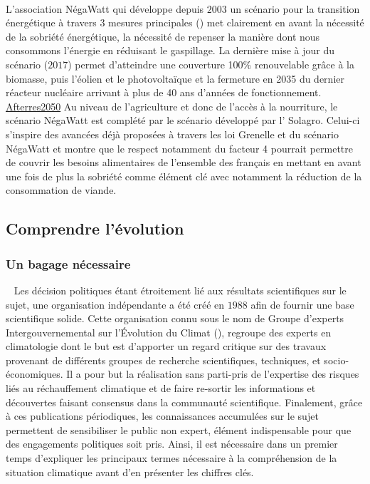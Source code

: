 ~\\ 
L’association NégaWatt qui développe depuis $2003$ un scénario pour la transition énergétique
à travers 3 mesures principales () met clairement
en avant la nécessité de la sobriété énergétique, la nécessité de repenser la manière
dont nous consommons l’énergie en réduisant le gaspillage. La dernière mise à jour
du scénario ($2017$) permet d’atteindre une couverture 100\% renouvelable grâce à la
biomasse, puis l’éolien et le photovoltaïque et la fermeture en 2035 du dernier
réacteur nucléaire arrivant à plus de 40 ans d’années de fonctionnement.
\href{https://fr.wikipedia.org/wiki/Afterres2050}{Afterres2050}
Au niveau de l’agriculture et donc de l’accès à la nourriture, le scénario NégaWatt
est complété par le scénario  développé par l’ Solagro. Celui-ci s’inspire
des avancées déjà proposées à travers les loi Grenelle et du scénario NégaWatt et montre
que le respect notamment du facteur 4 pourrait permettre de couvrir les besoins
alimentaires de l’ensemble des français en mettant en avant une fois de plus la
sobriété comme élément clé avec notamment la réduction de la consommation de viande.





\subsection{Comprendre l’évolution} %
\label{sub:comprendre_l_evolution}

\subsubsection{Un bagage nécessaire} %
\label{ssub:un_bagage_necessaire}
~
Les décision politiques étant étroitement lié aux résultats scientifiques sur le
sujet, une organisation indépendante a été créé en $1988$ afin de fournir une base
scientifique solide. Cette organisation connu sous le nom de
Groupe d'experts Intergouvernemental sur l'Évolution du Climat (), regroupe
des experts en climatologie dont le but est d’apporter un regard critique sur
des travaux provenant de différents groupes de recherche scientifiques, techniques,
et socio-économiques. Il a pour but la réalisation sans parti-pris de l’expertise
des risques liés au réchauffement climatique et de faire re-sortir les informations
et découvertes faisant consensus dans la communauté scientifique. Finalement, grâce à ces
publications périodiques, les connaissances accumulées sur le sujet permettent de
sensibiliser le public non expert, élément indispensable pour que des engagements
politiques soit pris. Ainsi, il est nécessaire dans un premier temps d’expliquer les principaux termes
nécessaire à la compréhension de la situation climatique avant d’en présenter les chiffres
clés.

